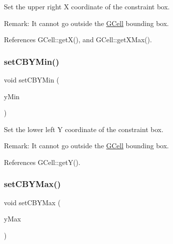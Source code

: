 Set the upper right X coordinate of the constraint box.

\begin{DoxyParagraph}{Remark\+:}
It cannot go outside the \hyperlink{classKatabatic_1_1GCell}{G\+Cell} bounding box. 
\end{DoxyParagraph}


References G\+Cell\+::get\+X(), and G\+Cell\+::get\+X\+Max().

\mbox{\label{classKatabatic_1_1AutoContact_a5b598929b39ad3ec202405b31ac02b1d}} 
\subsubsection{\texorpdfstring{set\+C\+B\+Y\+Min()}{setCBYMin()}}
{\footnotesize\ttfamily void set\+C\+B\+Y\+Min (\begin{DoxyParamCaption}\item[{\textbf{ Db\+U\+::\+Unit}}]{y\+Min }\end{DoxyParamCaption})\hspace{0.3cm}{\ttfamily [inline]}}

Set the lower left Y coordinate of the constraint box.

\begin{DoxyParagraph}{Remark\+:}
It cannot go outside the \hyperlink{classKatabatic_1_1GCell}{G\+Cell} bounding box. 
\end{DoxyParagraph}


References G\+Cell\+::get\+Y().

\mbox{\label{classKatabatic_1_1AutoContact_a1fdb3737d910a966e150a86d885f3c05}} 
\subsubsection{\texorpdfstring{set\+C\+B\+Y\+Max()}{setCBYMax()}}
{\footnotesize\ttfamily void set\+C\+B\+Y\+Max (\begin{DoxyParamCaption}\item[{\textbf{ Db\+U\+::\+Unit}}]{y\+Max }\end{DoxyParamCaption})\hspace{0.3cm}{\ttfamily [inline]}}

